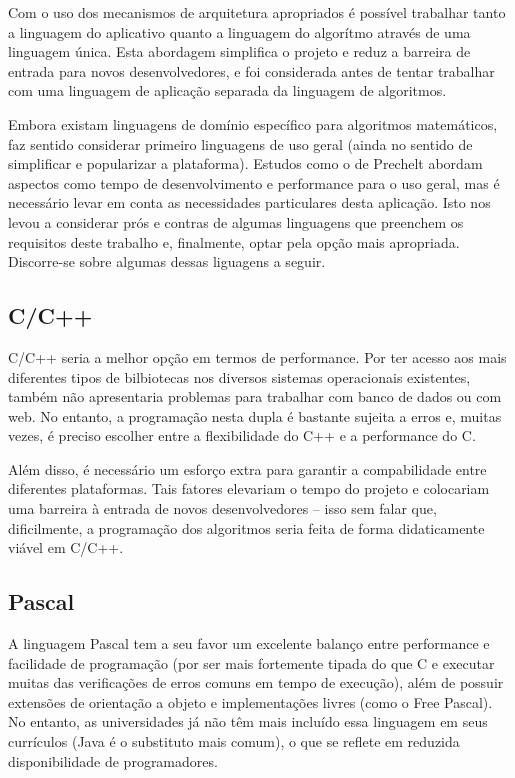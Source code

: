 \documentclass{abnt}
\begin{document}
	Com o uso dos mecanismos de arquitetura apropriados é possível trabalhar tanto a linguagem do aplicativo quanto a linguagem do algorítmo  através de uma linguagem única. Esta abordagem simplifica o projeto e reduz a barreira de entrada para novos desenvolvedores, e foi considerada antes de tentar trabalhar com uma linguagem de aplicação separada da linguagem de algoritmos.

	Embora existam linguagens de domínio específico para algoritmos matemáticos, faz sentido considerar primeiro linguagens de uso geral (ainda no sentido de simplificar e popularizar a plataforma). Estudos como o de Prechelt\cite{Prechelt} abordam aspectos como tempo de desenvolvimento e performance para o uso geral, mas é necessário levar em conta as necessidades particulares desta aplicação. Isto nos levou a considerar prós e contras de algumas linguagens que preenchem os requisitos deste trabalho e, finalmente, optar pela opção mais apropriada. Discorre-se sobre algumas dessas liguagens a seguir.

\subsection{C/C++}
	C/C++ seria a melhor opção em termos de performance. Por ter acesso aos mais diferentes tipos de bilbiotecas nos diversos sistemas operacionais existentes, também não apresentaria problemas para trabalhar com banco de dados ou com web. No entanto, a programação nesta dupla é bastante sujeita a erros e, muitas vezes, é preciso escolher entre a flexibilidade do C++ e a performance do C.

	Além disso, é necessário um esforço extra para garantir a compabilidade entre diferentes plataformas. Tais fatores elevariam o tempo do  projeto e colocariam uma barreira à entrada de novos desenvolvedores – isso sem falar que, dificilmente, a programação dos algoritmos seria feita de forma didaticamente viável em C/C++.

\subsection{Pascal}
	A linguagem Pascal tem a seu favor um excelente balanço entre performance e facilidade de programação (por ser mais fortemente tipada do que C e executar muitas das verificações de erros comuns em tempo de execução), além de possuir extensões de orientação a objeto e implementações livres (como o Free Pascal). No entanto, as universidades já não têm mais incluído essa linguagem em seus currículos (Java é o substituto mais comum), o que se reflete em reduzida disponibilidade de programadores.
\end{document}
